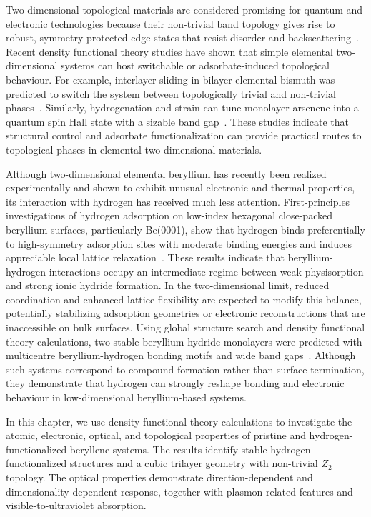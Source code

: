 Two-dimensional topological materials are considered promising for quantum and electronic technologies because their non-trivial band topology gives rise to robust,
symmetry-protected edge states that resist disorder and backscattering~\cite{weber2024roadmap}.
Recent density functional theory studies have shown that simple elemental two-dimensional systems can host switchable or adsorbate-induced topological behaviour.
For example,
interlayer sliding in bilayer elemental bismuth was predicted to switch the system between topologically trivial and non-trivial phases~\cite{qian2025switchable}.
Similarly,
hydrogenation and strain can tune monolayer arsenene into a quantum spin Hall state with a sizable band gap~\cite{zhang2016controllable}.
These studies indicate that structural control and adsorbate functionalization can provide practical routes to topological phases in elemental two-dimensional materials.

Although two-dimensional elemental beryllium has recently been realized experimentally and shown to exhibit unusual electronic and thermal properties,
its interaction with hydrogen has received much less attention.
First-principles investigations of hydrogen adsorption on low-index hexagonal close-packed beryllium surfaces,
particularly Be(0001),
show that hydrogen binds preferentially to high-symmetry adsorption sites with moderate binding energies and induces appreciable local lattice relaxation~\cite{bachurin2015ab}.
These results indicate that beryllium-hydrogen interactions occupy an intermediate regime between weak physisorption and strong ionic hydride formation.
In the two-dimensional limit,
reduced coordination and enhanced lattice flexibility are expected to modify this balance,
potentially stabilizing adsorption geometries or electronic reconstructions that are inaccessible on bulk surfaces.
Using global structure search and density functional theory calculations,
two stable beryllium hydride monolayers were predicted with multicentre beryllium-hydrogen bonding motifs and wide band gaps~\cite{li2018global}.
Although such systems correspond to compound formation rather than surface termination,
they demonstrate that hydrogen can strongly reshape bonding and electronic behaviour in low-dimensional beryllium-based systems.

In this chapter,
we use density functional theory calculations to investigate the atomic,
electronic,
optical,
and topological properties of pristine and hydrogen-functionalized beryllene systems.
The results identify stable hydrogen-functionalized structures and a cubic trilayer geometry with non-trivial $Z_{2}$ topology.
The optical properties demonstrate direction-dependent and dimensionality-dependent response,
together with plasmon-related features and visible-to-ultraviolet absorption.

